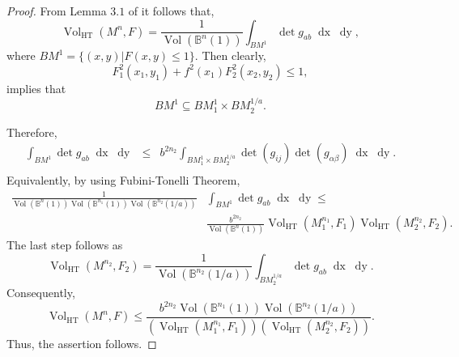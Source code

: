 \documentclass[pdflatex,sn-mathphys-num]{sn-jnl}%
\theoremstyle{thmstyleone}%
\theoremstyle{thmstyletwo}%
\theoremstyle{thmstylethree}%
\begin{document}
	\begin{proof}
	From Lemma $3.1$ of \cite{sc} it follows that,
		\begin{equation}\label{ss2}
			\operatorname{Vol}_{\operatorname{\operatorname{HT}}}(M^n,F)= \frac{1}{\operatorname{Vol}(\mathbb{B}^n(1))}\int_{BM^1}\det g_{ab}\;\operatorname{dx}\;\operatorname{dy},
		\end{equation}
            where $BM^1=\{(x,y)|F(x,y)\leq 1\}$. Then
            clearly,
            \begin{equation}\label{BHMAX}
                F_1^2(x_1, y_1) +f^2(x_1) F_2^2(x_2, y_2)\leq 1,   
                \end{equation}
		implies that 
        \begin{equation}\label{BHMAX1}
            BM^1\subseteq BM_1^1 \times BM_2^{1/a}.       
        \end{equation}
		
		Therefore, 
		\begin{eqnarray}
			\int_{BM^1}\det g_{ab} \; \operatorname{dx} \;\operatorname{dy} & \leq &b^{2n_2}\int_{BM_1^1 \times BM_2^{1/a}} \det (g_{ij})\det (g_{\alpha\beta})\; \operatorname{dx} \; \operatorname{dy}. \\ \nonumber
		\end{eqnarray}
Equivalently, by using Fubini-Tonelli Theorem,
\begin{align}
      \frac{1}{\operatorname{Vol}(\mathbb{B}^n(1))\operatorname{Vol}(\mathbb{B}^{n_1}(1))\operatorname{Vol}(\mathbb{B}^{n_2}(1/a))}&\int_{BM^1}\det g_{ab} \; \operatorname{dx} \;\operatorname{dy}\leq\\ \nonumber
      &\frac{b^{2n_2}}{\operatorname{Vol}(\mathbb{B}^n(1))}\operatorname{Vol}_{\operatorname{HT}}(M_1^{n_1},F_1)\operatorname{Vol}_{\operatorname{HT}}(M_2^{n_2},F_2).  
      \end{align}
         The last step follows as
         $$\operatorname{Vol}_{\operatorname{HT}}(M^{n_2},F_2)=\frac{1}{\operatorname{Vol}(\mathbb{B}^{n_2}(1/a))}\int_{BM_2^{1/a}} \det g_{ab} \; \operatorname{dx} \; \operatorname{dy}.$$
         Consequently,
         $$\operatorname{Vol}_{\operatorname{HT}}(M^n,F)\leq\frac{b^{2n_2}\operatorname{Vol}(\mathbb{B}^{n_1}(1))\operatorname{Vol}(\mathbb{B}^{n_2}(1/a))}{(\operatorname{Vol}_{\operatorname{HT}}(M_1^{n_1},F_1))(\operatorname{Vol}_{\operatorname{HT}}(M_2^{n_2},F_2))}.$$
         Thus, the assertion follows.
	\end{proof}
\end{document}
